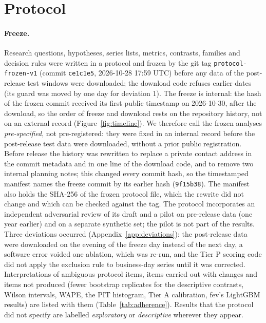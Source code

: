 \section{Protocol}
\label{sec:protocol}




\paragraph{Freeze.} Research questions, hypotheses, series lists, metrics, contrasts, families and decision rules were written in a
protocol and frozen by the git tag \texttt{protocol-frozen-v1} (commit \texttt{ce1c1e5}, 2026-10-28 17:59 UTC) before any data of
the post-release test windows were downloaded; the download code refuses earlier dates (its guard was moved by one day for deviation 1). The freeze is internal: the hash of the
frozen commit received its first public timestamp on 2026-10-30, after the download, so the order of freeze and download rests
on the repository history, not on an external record (Figure~\ref{fig:timeline}). We therefore call the frozen analyses
\emph{pre-specified}, not pre-registered: they were fixed in an internal record before the post-release test data were downloaded, without a
prior public registration. Before release the history was rewritten to
replace a private contact address in the commit metadata and in one line of the download code, and to remove two internal
planning notes; this changed every commit hash, so the timestamped manifest names the freeze commit by its earlier hash
(\texttt{9f15b38}). The manifest also holds the SHA-256 of the frozen protocol file, which the rewrite did not change and which can be
checked against the tag. The protocol incorporates an independent
adversarial review of its draft and a pilot on pre-release data (one year earlier) and on a separate synthetic set; the pilot is not
part of the results. Three deviations occurred (Appendix~\ref{app:deviations}): the post-release data were downloaded on the evening of
the freeze day instead of the next day, a software error voided one ablation, which was re-run, and the Tier P scoring code did
not apply the exclusion rule to business-day series until it was corrected. Interpretations of
ambiguous protocol items, items carried out with changes and items not produced (fewer bootstrap replicates for the descriptive
contrasts, Wilson intervals, WAPE, the PIT histogram, Tier A calibration, fev's LightGBM results) are listed with them
(Table~\ref{tab:adherence}). Results that the protocol did not specify are labelled \emph{exploratory} or
\emph{descriptive} wherever they appear.

